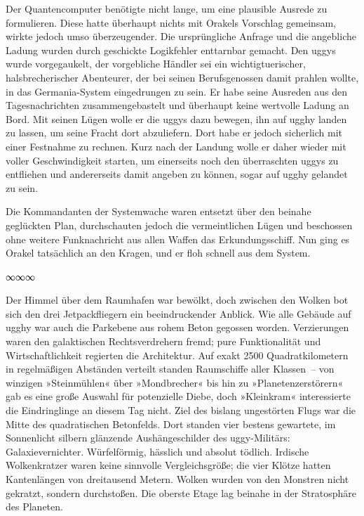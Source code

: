 Der Quantencomputer benötigte nicht lange, um eine plausible Ausrede zu formulieren. Diese hatte überhaupt nichts mit Orakels Vorschlag gemeinsam, wirkte jedoch umso überzeugender. Die ursprüngliche Anfrage und die angebliche Ladung wurden durch geschickte Logikfehler enttarnbar gemacht. Den uggys wurde vorgegaukelt, der vorgebliche Händler sei ein wichtigtuerischer, halsbrecherischer Abenteurer, der bei seinen Berufsgenossen damit prahlen wollte, in das Germania-System eingedrungen zu sein. Er habe seine Ausreden aus den Tagesnachrichten zusammengebastelt und überhaupt keine wertvolle Ladung an Bord. Mit seinen Lügen wolle er die uggys dazu bewegen, ihn auf ugghy landen zu lassen, um seine Fracht dort abzuliefern. Dort habe er jedoch sicherlich mit einer Festnahme zu rechnen. Kurz nach der Landung wolle er daher wieder mit voller Geschwindigkeit starten, um einerseits noch den überraschten uggys zu entfliehen und andererseits damit angeben zu können, sogar auf ugghy gelandet zu sein.

Die Kommandanten der Systemwache waren entsetzt über den beinahe geglückten Plan, durchschauten jedoch die vermeintlichen Lügen und beschossen ohne weitere Funknachricht aus allen Waffen das Erkundungsschiff. Nun ging es Orakel tatsächlich an den Kragen, und er floh schnell aus dem System.

\begin{center}
∞∞∞
\end{center}

Der Himmel über dem Raumhafen war bewölkt, doch zwischen den Wolken bot sich den drei Jetpackfliegern ein beeindruckender Anblick. Wie alle Gebäude auf ugghy war auch die Parkebene aus rohem Beton gegossen worden. Verzierungen waren den galaktischen Rechtsverdrehern fremd; pure Funktionalität und Wirtschaftlichkeit regierten die Architektur. Auf exakt 2500 Quadratkilometern in regelmäßigen Abständen verteilt standen Raumschiffe aller Klassen~– von winzigen »Steinmühlen« über »Mondbrecher« bis hin zu »Planetenzerstörern« gab es eine große Auswahl für potenzielle Diebe, doch »Kleinkram« interessierte die Eindringlinge an diesem Tag nicht. Ziel des bislang ungestörten Flugs war die Mitte des quadratischen Betonfelds. Dort standen vier bestens gewartete, im Sonnenlicht silbern glänzende Aushängeschilder des uggy-Militärs: Galaxievernichter. Würfelförmig, hässlich und absolut tödlich. Irdische Wolkenkratzer waren keine sinnvolle Vergleichsgröße; die vier Klötze hatten Kantenlängen von dreitausend Metern. Wolken wurden von den Monstren nicht gekratzt, sondern durchstoßen. Die oberste Etage lag beinahe in der Stratosphäre des Planeten.

